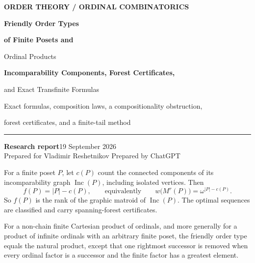 \documentclass[11pt,letterpaper]{article}
\theoremstyle{definition}
\theoremstyle{remark}
\newcommand{\fot}{f}
\newcommand{\Inc}{\operatorname{Inc}}
\begin{document}
\begin{titlepage}
\color{ink}
\vspace*{-.35in}
{\small\bfseries\color{olive}\MakeUppercase{Order theory \enspace / \enspace Ordinal combinatorics}}
\par\vspace{.15in}
{\fontsize{27}{31}\selectfont\bfseries\color{forest}Friendly Order Types\par}
\vspace{.08in}
{\fontsize{25}{29}\selectfont\bfseries\color{forest}of Finite Posets and\par Ordinal Products\par}
\vspace{.12in}
{\fontsize{16}{20}\selectfont\bfseries\color{olive}Incomparability Components, Forest Certificates,\par
and Exact Transfinite Formulas\par}
\vspace{.16in}
{\large Exact formulas, composition laws, a compositionality obstruction,\par
forest certificates, and a finite-tail method\par}
\vspace{.12in}
\noindent\textcolor{olive}{\rule{\textwidth}{1pt}}
\vspace{.10in}
\noindent\textbf{Research report}\hfill 19 September 2026\\[.35em]
Prepared for Vladimir Reshetnikov \hfill Prepared by ChatGPT
\vspace{.09in}
\begin{resultbox}[title={\bfseries Main conclusions}]
\small
For a finite poset $P$, let $c(P)$ count the connected components of its
incomparability graph $\Inc(P)$, including isolated vertices. Then
\[
 \fot(P)=|P|-c(P),
 \qquad\text{equivalently}\qquad
 w\bigl(M^r(P)\bigr)=\omega^{|P|-c(P)}.
\]
So $\fot(P)$ is the rank of the graphic matroid of $\Inc(P)$. The optimal
sequences are classified and carry spanning-forest certificates.

For a non-chain finite Cartesian product of ordinals, and more generally for
a product of infinite ordinals with an arbitrary finite poset, the friendly
order type equals the natural product, except that one rightmost successor is
removed when every ordinal factor is a successor and the finite factor has a
greatest element.


\end{resultbox}
\end{titlepage}
\end{document}
